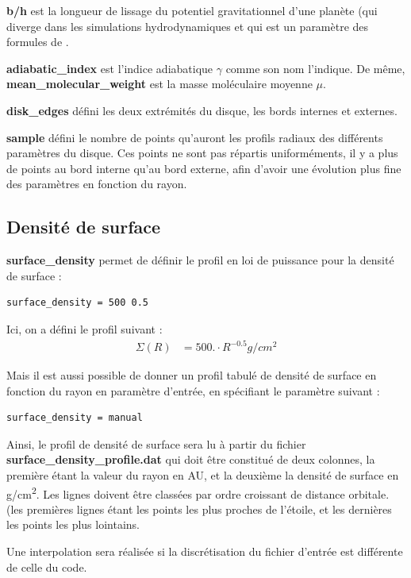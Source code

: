 \textbf{b/h} est la longueur de lissage du potentiel gravitationnel d'une planète (qui diverge dans les simulations hydrodynamiques et qui est un paramètre des formules de \cite{paardekooper2011torque}.

\textbf{adiabatic\_index} est l'indice adiabatique $\gamma$ comme son nom l'indique. De même, \textbf{mean\_molecular\_weight} est la masse moléculaire moyenne $\mu$.

\textbf{disk\_edges} défini les deux extrémités du disque, les bords internes et externes.

\textbf{sample} défini le nombre de points qu'auront les profils radiaux des différents paramètres du disque. Ces points ne sont pas répartis uniforméments, il y a plus de points au bord interne qu'au bord externe, afin d'avoir une évolution plus fine des paramètres en fonction du rayon.

\subsection{Densité de surface}
\textbf{surface\_density} permet de définir le profil en loi de puissance pour la densité de surface : 
\begin{verbatim}
surface_density = 500 0.5
\end{verbatim}
Ici, on a défini le profil suivant : 
\begin{align*}
\Sigma(R) &= 500. \cdot R^{-0.5} \unit{g/cm^2}
\end{align*}

Mais il est aussi possible de donner un profil tabulé de densité de surface en fonction du rayon en paramètre d'entrée, en spécifiant le paramètre suivant : 
\begin{verbatim}
surface_density = manual
\end{verbatim}
Ainsi, le profil de densité de surface sera lu à partir du fichier \textbf{surface\_density\_profile.dat} qui doit être constitué de deux colonnes, la première étant la valeur du rayon en AU, et la deuxième la densité de surface en \unit{g/cm^2}. Les lignes doivent être classées par ordre croissant de distance orbitale. (les premières lignes étant les points les plus proches de l'étoile, et les dernières les points les plus lointains. 

\begin{remarque}
Une interpolation sera réalisée si la discrétisation du fichier d'entrée est différente de celle du code.
\end{remarque}

